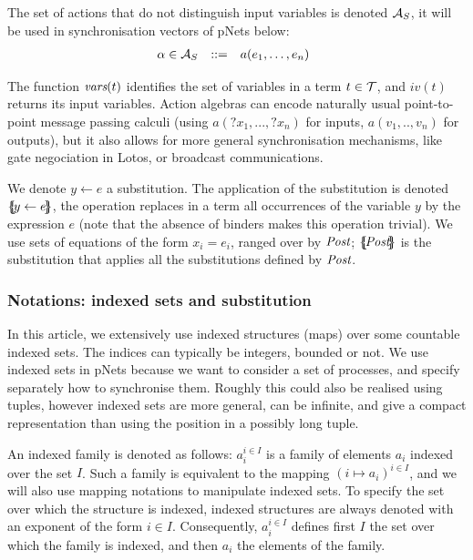 \documentclass{lncs/llncs}
\begin{document}
The set of actions that do not distinguish input variables is denoted $\mathcal{A}_S$, it will be used in synchronisation vectors of pNets below:
\[\begin{array}[l]{rcl@{\quad}l}
  \alpha\in \AlgAS &::=&a(e_1,\ldots,e_n)
\end{array}
\]

The function
$\vars(t)$ identifies the set of variables in a term
$t\in\mathcal{T}$, and $iv(t)$ returns its input variables.
Action algebras can encode naturally usual point-to-point message passing calculi (using 
$a(?x_1,...,?x_n)$ for inputs, $a(v_1,..,v_n)$ for outputs), but it also allows
for more general synchronisation mechanisms, like gate negociation in Lotos, or broadcast
communications. 

\smallskip

We denote $y\gets e$ a substitution. The application of the substitution is denoted
$\{\hspace{-0.88ex}\{\!y\gets e\!\}\hspace{-0.87ex}\}$, the operation replaces in a term all occurrences 
of the variable $y$ by the expression $e$ (note that the absence of binders makes this operation 
trivial). 
We use sets of equations of the form $x_i=e_i$, ranged over by $\Post$; $\subst{\Post}$ is the substitution that applies all the substitutions defined by $\Post$.


\subsubsection*{Notations: indexed sets and substitution}



In this article, we extensively use indexed structures
(maps) over some countable indexed sets.   The indices can typically be
integers, bounded or not. We use indexed sets in pNets because we want to consider a set of processes, and specify separately how to synchronise them. Roughly this could also be realised using tuples, however indexed sets are more general, can be infinite, and give a compact representation than using the position in a possibly long tuple.

An indexed family is denoted as
follows: $a_i^{i\in I}$ is a family of elements $a_i$ indexed over the
set $I$. Such a family
is equivalent to the mapping $(i\mapsto a_i)^{i\in I}$, and we will also use mapping 
notations to manipulate indexed sets.
To specify the set over which the structure is indexed, 
indexed structures are always denoted with an exponent of the form $i\in I$.
Consequently, $a_i^{i\in I}$ defines first $I$ the set over which the
family is indexed, and then $a_i$ the elements of the family.
\end{document}
